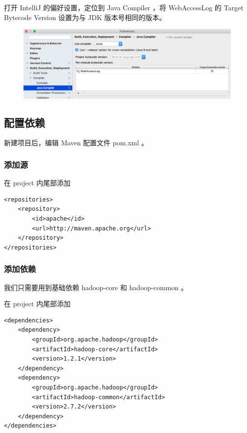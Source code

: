 \documentclass{article}
\begin{document}
打开 IntelliJ 的偏好设置，定位到 Java Compiler ，将 WebAccessLog 的 Target Bytecode Version 设置为与 JDK 版本号相同的版本。

\begin{figure}[!ht]
\centering
\includegraphics[scale=0.4]{image/6.png}
\end{figure}

\subsection{配置依赖}

新建项目后，编辑 Maven 配置文件 pom.xml 。

\subsubsection{添加源}

在 project 内尾部添加

\begin{lstlisting}
<repositories>
    <repository>
        <id>apache</id>
        <url>http://maven.apache.org</url>
    </repository>
</repositories>
\end{lstlisting}

\subsubsection{添加依赖}

我们只需要用到基础依赖 hadoop-core 和 hadoop-common 。

在 project 内尾部添加

\begin{lstlisting}
<dependencies>
    <dependency>
        <groupId>org.apache.hadoop</groupId>
        <artifactId>hadoop-core</artifactId>
        <version>1.2.1</version>
    </dependency>
    <dependency>
        <groupId>org.apache.hadoop</groupId>
        <artifactId>hadoop-common</artifactId>
        <version>2.7.2</version>
    </dependency>
</dependencies>
\end{lstlisting}
\end{document}
